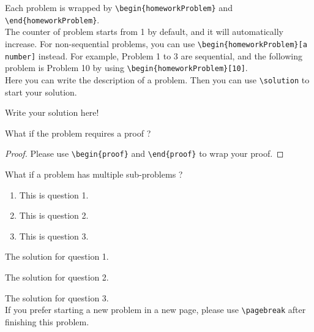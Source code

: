 \documentclass{homework}
\begin{document}
\maketitle
\pagebreak


%
%
\begin{homeworkProblem}
    Each problem is wrapped by \verb|\begin{homeworkProblem}| and \verb|\end{homeworkProblem}|.\\

    The counter of problem starts from 1 by default, and it will automatically increase.
    For non-sequential problems, you can use \verb|\begin{homeworkProblem}[a number]| instead.
    For example, Problem 1 to 3 are sequential, and the following problem is Problem 10 by using \verb|\begin{homeworkProblem}[10]|.\\
    
    Here you can write the description of a problem.
    Then you can use \verb|\solution| to start your solution.
    
    \solution

    Write your solution here!

\end{homeworkProblem}


%
%
\begin{homeworkProblem}
    What if the problem requires a proof ? 

    \begin{proof}
        Please use \verb|\begin{proof}| and \verb|\end{proof}| to wrap your proof.
    \end{proof}

\end{homeworkProblem}


%
%
\begin{homeworkProblem}
    What if a problem has multiple sub-problems ?

    \begin{enumerate}[(1)]
        \item This is question 1.
        \item This is question 2.
        \item This is question 3.
    \end{enumerate}

    \solution[1]
    The solution for question 1.
    
    \solution[2]
    The solution for question 2.

    \solution[3]
    The solution for question 3.\\

    If you prefer starting a new problem in a new page, please use \verb|\pagebreak| after finishing this problem.

\end{homeworkProblem}
\end{document}
